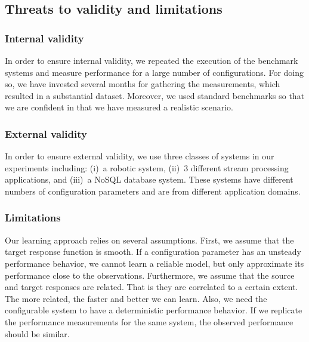 \subsection{Threats to validity and limitations}

\subsubsection{Internal validity}
In order to ensure internal validity, we repeated the execution of the benchmark systems and measure performance for a large number of configurations. %
For doing so, we have invested several months for gathering the measurements, which resulted in a substantial dataset. Moreover, we used standard benchmarks so that we are confident in that we have measured a realistic scenario.

\subsubsection{External validity}
In order to ensure external validity, we use three classes of systems in our experiments including: (i)~a robotic system, (ii)~3 different stream processing applications, and (iii)~a NoSQL database system. These systems have different numbers of configuration parameters and are from different application domains.

\subsubsection{Limitations}
Our learning approach relies on several assumptions. First, we assume that the target response function is smooth. If a configuration parameter has an unsteady performance behavior, we cannot learn a reliable model, but only approximate its performance close to the observations. Furthermore, we assume that the source and target responses are related. That is they are correlated to a certain extent. The more related, the faster and better we can learn. Also, we need the configurable system to have a deterministic performance behavior. If we replicate the performance measurements for the same system, the observed performance should be similar. %

\newpage